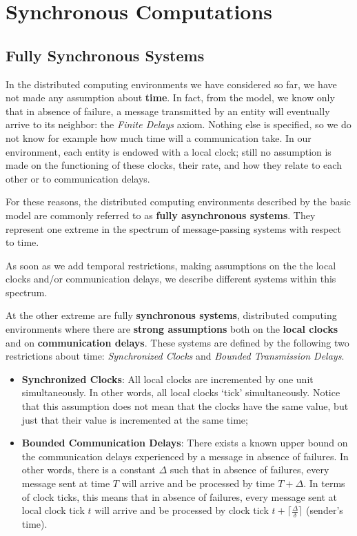 \section{Synchronous Computations}
\subsection{Fully Synchronous Systems}
In the distributed computing environments we have considered so far, we have not made any assumption about \textbf{time}. In fact, from the model, we know only that in absence of failure, a message transmitted by an entity will eventually arrive to its neighbor: the \textit{Finite Delays} axiom. Nothing else is specified, so we do not know for example how much time will a communication take. In our environment, each entity is endowed with a local clock; still no assumption is made on the functioning of these clocks, their rate, and how they relate to each other or to communication delays. 

For these reasons, the distributed computing environments described by the basic model are commonly referred to as \textbf{fully asynchronous systems}. They represent one extreme in the spectrum of message-passing systems with respect to time. 

As soon as we add temporal restrictions, making assumptions on the the local clocks and/or communication delays, we describe different systems within this spectrum. 

At the other extreme are fully \textbf{synchronous systems}, distributed computing environments where there are \textbf{strong assumptions} both on the \textbf{local clocks} and on \textbf{communication delays}. These systems are defined by the following two restrictions about time: \textit{Synchronized Clocks} and \textit{Bounded Transmission Delays}.

\begin{itemize}
    \item \textbf{Synchronized Clocks}: All local clocks are incremented by one unit simultaneously. In other words, all local clocks ‘tick’ simultaneously. Notice that this assumption does not mean that the clocks have the same value, but just that their value is incremented at the same time;
    \item \textbf{Bounded Communication Delays}: There exists a known upper bound on the communication delays experienced by a message in absence of failures. In other words, there is a constant $\Delta$ such that in absence of failures, every message sent at time $T$ will arrive and be processed by time $T + \Delta$. In terms of clock ticks, this means that in absence of failures, every message sent at local clock tick $t$ will arrive and be processed by clock tick $t + \lceil \frac{\Delta}{\delta} \rceil $ (sender’s time).
\end{itemize}

